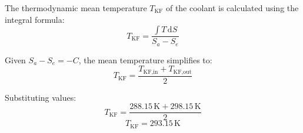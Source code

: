 The thermodynamic mean temperature \( T_{\text{KF}} \) of the coolant is calculated using the integral formula:  
\[
T_{\text{KF}} = \frac{\int T \, \text{d}S}{S_a - S_e}
\]  

Given \( S_a - S_e = -C \), the mean temperature simplifies to:  
\[
T_{\text{KF}} = \frac{T_{\text{KF,in}} + T_{\text{KF,out}}}{2}
\]  

Substituting values:  
\[
T_{\text{KF}} = \frac{288.15 \, \text{K} + 298.15 \, \text{K}}{2}
\]  
\[
T_{\text{KF}} = 293.15 \, \text{K}
\]